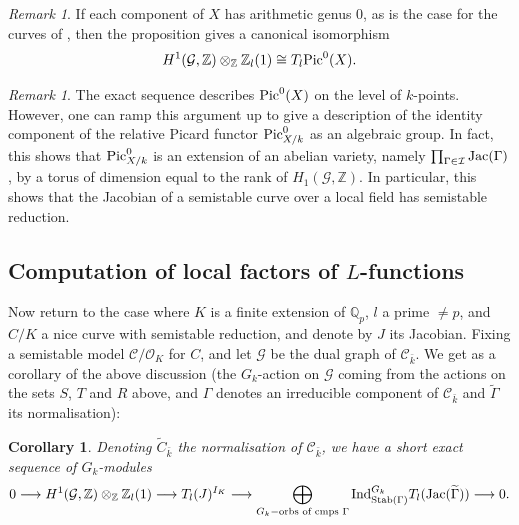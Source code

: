\documentclass[12pt]{amsart}
\numberwithin{equation}{section}
\newtheorem{cor}[equation]{Corollary}
\theoremstyle{remark}
\newtheorem{remark}[equation]{Remark}
\theoremstyle{definition}
\theoremstyle{definition}
\theoremstyle{definition}
\theoremstyle{definition}
\theoremstyle{definition}
\theoremstyle{definition}
\begin{document}
\begin{remark}
If each component of $X$ has arithmetic genus $0$, as is the case for the curves of , then the proposition gives a canonical isomorphism 
\[H^1(\mathcal{G},\mathbb{Z}) \otimes_\mathbb{Z}\mathbb{Z}_l(1)\cong  T_l  \textup{Pic}^0(X).\]
\end{remark}

\begin{remark} \label{semistable implies semistable jac}
The exact sequence  describes $\textup{Pic}^0(X)$ on the level of $k$-points. However, one can ramp this argument up to give a description of the identity component of the relative Picard functor $\textup{Pic}^0_{X/k}$ as an algebraic group. In fact, this shows that $\textup{Pic}^0_{X/k}$ is an extension of an abelian variety, namely $\prod_{\Gamma \in \mathcal{I}}\textup{Jac}(\Gamma)$, by a torus of dimension equal to the rank of $H_1(\mathcal{G},\mathbb{Z})$. In particular, this shows that the Jacobian of a semistable curve over a local field has semistable reduction.
\end{remark}

\subsection{Computation of local factors of $L$-functions}

Now return to the case where $K$ is a finite extension of $\mathbb{Q}_p$, $l$ a prime $\neq p$, and $C/K$ a nice curve with semistable reduction, and denote by $J$ its Jacobian. Fixing a semistable model $\mathcal{C}/\mathcal{O}_K$ for $C$, and let $\mathcal{G}$ be the dual graph of $\mathcal{C}_{\bar{k}}$. We get as a corollary of the above discussion (the $G_k$-action on $\mathcal{G}$ coming from the actions on the sets $S$, $T$ and $R$ above, and $\Gamma$ denotes an irreducible component of $\mathcal{C}_{\bar{k}}$ and $\widetilde{\Gamma}$ its normalisation):

\begin{cor}
Denoting $\tilde{C}_{\bar{k}}$ the normalisation of $\mathcal{C}_{\bar{k}}$, we have a short exact sequence of $G_k$-modules
$$
  0 \longrightarrow H^1(\mathcal{G},\mathbb{Z}) \otimes_\mathbb{Z}\mathbb{Z}_l(1) \longrightarrow T_l(J)^{I_K} \longrightarrow \bigoplus_{G_k-\textup{orbs of cmps }\Gamma}\textup{Ind}_{\textup{Stab}(\Gamma)}^{G_k} T_l (\textup{Jac}(\widetilde{\Gamma})) \longrightarrow 0.
$$
\end{cor}
\end{document}
